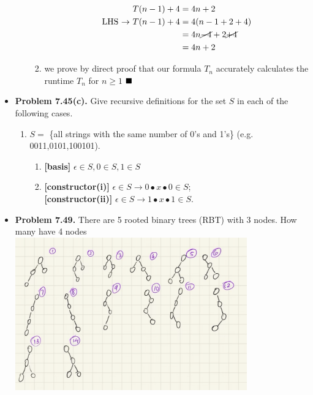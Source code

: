 \documentclass{article}
\begin{document}
\begin{itemize}
\begin{enumerate}[label=(\alph*)]
\begin{enumerate}[label=(\roman*)]
\begin{center}
                \end{center}
                \begin{align*}
                    T(n-1) + 4 &= 4n + 2\\
                    \text{LHS $\rightarrow$ } T(n-1) + 4 &= 4(n-1 + 2 + 4)\\
                    &= 4n \cancel{-4} + 2 \cancel{+4}\\
                    &= 4n + 2
                \end{align*}
                \item we prove by direct proof that our formula $T_n$ accurately calculates the runtime $T_n$ for $n \geq 1$ $\hfill\blacksquare$
            \end{enumerate}
        \end{enumerate}
        \item \textbf{Problem 7.45(c).} Give recursive definitions for the set $S$ in each of the following cases.
        \begin{enumerate}[label=(c)]
            \item $S =$ \{all strings with the same number of 0's and 1's\} (e.g. 0011,0101,100101).
            \begin{enumerate}[label=\arabic*.]
                \item \textbf{[basis]} $\epsilon \in S, 0 \in S, 1 \in S$
                \item \textbf{[constructor(i)]} $\epsilon \in S \rightarrow 0 \bullet x \bullet 0 \in S$;\\
                \textbf{[constructor(ii)]} $\epsilon \in S \rightarrow 1 \bullet x \bullet 1 \in S$.
            \end{enumerate}
        \end{enumerate}
        \item \textbf{Problem 7.49.} There are 5 rooted binary trees (RBT) with 3 nodes. How many have 4 nodes\\
        \includegraphics[width=100mm,scale=0.5]{binaryTrees.png}

\end{itemize}
\end{document}
